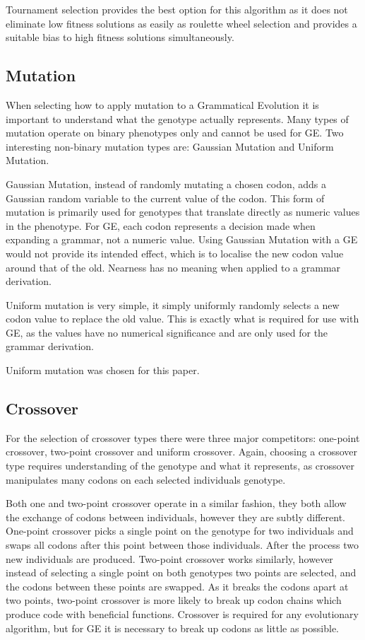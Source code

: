 \documentclass[a4paper, 12pt]{article}
\begin{document}
Tournament selection provides the best option for this algorithm as it does not eliminate low fitness solutions as easily as roulette wheel selection and provides a suitable bias to high fitness solutions simultaneously.

\subsection{Mutation}
When selecting how to apply mutation to a Grammatical Evolution it is important to understand what the genotype actually represents. Many types of mutation operate on binary phenotypes only and cannot be used for GE. Two interesting non-binary mutation types are: Gaussian Mutation and Uniform Mutation. 

Gaussian Mutation, instead of randomly mutating a chosen codon, adds a Gaussian random variable to the current value of the codon. This form of mutation is primarily used for genotypes that translate directly as numeric values in the phenotype. For GE, each codon represents a decision made when expanding a grammar, not a numeric value. Using Gaussian Mutation with a GE would not provide its intended effect, which is to localise the new codon value around that of the old. Nearness has no meaning when applied to a grammar derivation.

Uniform mutation is very simple, it simply uniformly randomly selects a new codon value to replace the old value. This is exactly what is required for use with GE, as the values have no numerical significance and are only used for the grammar derivation.

Uniform mutation was chosen for this paper.

\subsection{Crossover}
For the selection of crossover types there were three major competitors: one-point crossover, two-point crossover and uniform crossover. Again, choosing a crossover type requires understanding of the genotype and what it represents, as crossover manipulates many codons on each selected individuals genotype.

Both one and two-point crossover operate in a similar fashion, they both allow the exchange of codons between individuals,  however they are subtly different. One-point crossover picks a single point on the genotype for two individuals and swaps all codons after this point between those individuals. After the process two new individuals are produced. Two-point crossover works similarly, however instead of selecting a single point on both genotypes two points are selected, and the codons between these points are swapped. As it breaks the codons apart at two points, two-point crossover is more likely to break up codon chains which produce code with beneficial functions. Crossover is required for any evolutionary algorithm, but for GE it is necessary to break up codons as little as possible.
\end{document}
